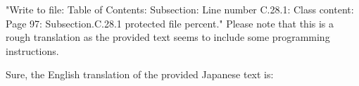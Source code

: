 \relax
\providecommand\hyper@newdestlabel[2]{}

"Write to file: Table of Contents: Subsection: Line number C.28.1: Class content: Page 97: Subsection.C.28.1 protected file percent." Please note that this is a rough translation as the provided text seems to include some programming instructions.

Sure, the English translation of the provided Japanese text is:

